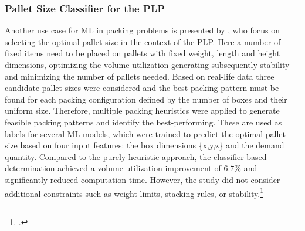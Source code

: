 \subsubsection{Pallet Size Classifier for the \gls{PLP}}
Another use case for \gls{ML} in packing problems is presented by \textcite{aylak_application_2021},
who focus on selecting the optimal pallet size in the context of the \gls{PLP}. Here a number of fixed items
need to be placed on pallets with fixed weight, length and height dimensions, optimizing the volume utilization
generating subsequently stability and minimizing the number of pallets needed. Based on real-life data
three candidate pallet sizes were considered and the best packing pattern must be found for each packing
configuration defined by the number of boxes and their uniform size. Therefore, multiple packing heuristics were applied to
generate feasible packing patterns and identify the best-performing. These are used as labels for several
\gls{ML} models, which were trained to predict the optimal pallet size based on four input features: the box
dimensions \{x,y,z\} and the demand quantity. Compared to the purely heuristic approach, the classifier-based
determination achieved a volume utilization improvement of $6.7\%$ and significantly reduced computation time.
However, the study did not consider additional constraints such as weight limits, stacking rules, or stability.\footcite[cf.][pp. 12--14]{aylak_application_2021}

\parbreak

